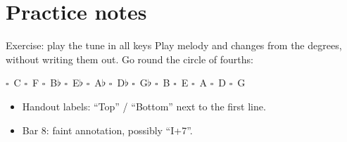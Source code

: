 \section{Practice notes}
\begin{study}{Exercise: play the tune in all keys}
Play melody and changes from the degrees, without writing them out.
Go round the circle of fourths:

\smallskip
\noindent
$\square$~C \quad $\square$~F \quad $\square$~B$\flat$ \quad $\square$~E$\flat$ \quad
$\square$~A$\flat$ \quad $\square$~D$\flat$ \quad $\square$~G$\flat$ \quad
$\square$~B \quad $\square$~E \quad $\square$~A \quad $\square$~D \quad $\square$~G
\end{study}

\begin{itemize}
\item Handout labels: ``Top'' / ``Bottom'' next to the first line.
\item Bar 8: faint annotation, possibly ``I+7''.
\end{itemize}
